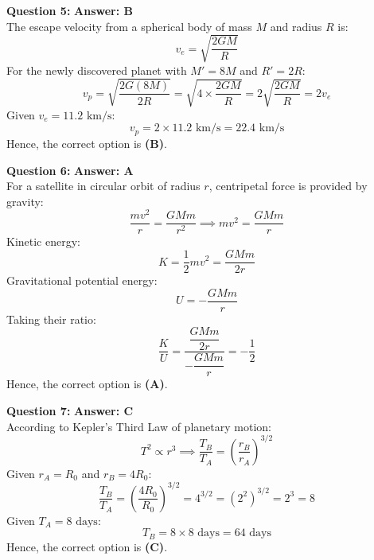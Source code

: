 \documentclass[11pt,a4paper]{article}
\begin{document}
\begin{tcolorbox}[solbox]
  \textbf{\textcolor{primaryDark}{Question 5:}} \hfill \textbf{\textcolor{l1Green}{Answer: B}}\\
  \vspace{3pt}
  The escape velocity from a spherical body of mass $M$ and radius $R$ is:
$$v_e = \sqrt{\frac{2GM}{R}}$$
\vspace{3pt}
For the newly discovered planet with $M' = 8M$ and $R' = 2R$:
$$v_p = \sqrt{\frac{2G(8M)}{2R}} = \sqrt{4 \times \frac{2GM}{R}} = 2\sqrt{\frac{2GM}{R}} = 2 v_e$$
\vspace{3pt}
Given $v_e = 11.2\text{ km/s}$:
$$v_p = 2 \times 11.2\text{ km/s} = 22.4\text{ km/s}$$
\vspace{3pt}
Hence, the correct option is \textbf{(B)}.
\end{tcolorbox}
\vspace{3pt}

\begin{tcolorbox}[solbox]
  \textbf{\textcolor{primaryDark}{Question 6:}} \hfill \textbf{\textcolor{l1Green}{Answer: A}}\\
  \vspace{3pt}
  For a satellite in circular orbit of radius $r$, centripetal force is provided by gravity:
$$\frac{m v^2}{r} = \frac{GMm}{r^2} \implies m v^2 = \frac{GMm}{r}$$
\vspace{3pt}
Kinetic energy:
$$K = \frac{1}{2}m v^2 = \frac{GMm}{2r}$$
\vspace{3pt}
Gravitational potential energy:
$$U = -\frac{GMm}{r}$$
\vspace{3pt}
Taking their ratio:
$$\frac{K}{U} = \frac{\dfrac{GMm}{2r}}{-\dfrac{GMm}{r}} = -\frac{1}{2}$$
\vspace{3pt}
Hence, the correct option is \textbf{(A)}.
\end{tcolorbox}
\vspace{3pt}

\begin{tcolorbox}[solbox]
  \textbf{\textcolor{primaryDark}{Question 7:}} \hfill \textbf{\textcolor{l1Green}{Answer: C}}\\
  \vspace{3pt}
  According to Kepler's Third Law of planetary motion:
$$T^2 \propto r^3 \implies \frac{T_B}{T_A} = \left(\frac{r_B}{r_A}\right)^{3/2}$$
\vspace{3pt}
Given $r_A = R_0$ and $r_B = 4R_0$:
$$\frac{T_B}{T_A} = \left(\frac{4R_0}{R_0}\right)^{3/2} = 4^{3/2} = (2^2)^{3/2} = 2^3 = 8$$
\vspace{3pt}
Given $T_A = 8\text{ days}$:
$$T_B = 8 \times 8\text{ days} = 64\text{ days}$$
\vspace{3pt}
Hence, the correct option is \textbf{(C)}.
\end{tcolorbox}
\vspace{3pt}
\end{document}
